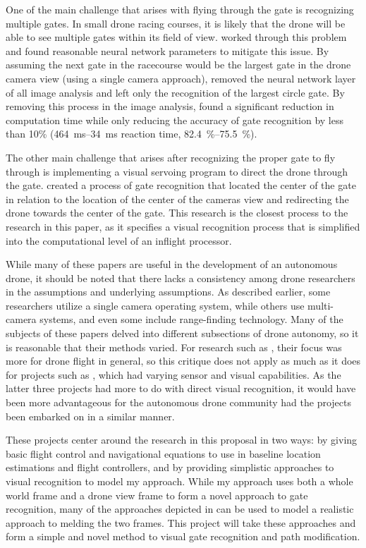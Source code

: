 One of the main challenge that arises with flying through the gate is recognizing multiple gates. In small drone racing courses, it is likely that the drone will be able to see multiple gates within its field of view. \cite{jung2018perception} worked through this problem and found reasonable neural network parameters to mitigate this issue. By assuming the next gate in the racecourse would be the largest gate in the drone camera view (using a single camera approach), \cite{jung2018perception} removed the neural network layer of all image analysis and left only the recognition of the largest circle gate. By removing this process in the image analysis, \cite{jung2018perception} found a significant reduction in computation time while only reducing the accuracy of gate recognition by less than 10\% (\SIrange{464}{34}{\milli\second} reaction time, \SIrange{82.4}{75.5}{\percent}).
    
The other main challenge that arises after recognizing the proper gate to fly through is implementing a visual servoing program to direct the drone through the gate. \cite{jung2018direct} created a process of gate recognition that located the center of the gate in relation to the location of the center of the cameras view and redirecting the drone towards the center of the gate. This research is the closest process to the research in this paper, as it specifies a visual recognition process that is simplified into the computational level of an inflight processor.
    
While many of these papers are useful in the development of an autonomous drone, it should be noted that there lacks a consistency among drone researchers in the assumptions and underlying assumptions. As described earlier, some researchers utilize a single camera operating system, while others use multi-camera systems, and even some include range-finding technology. Many of the subjects of these papers delved into different subsections of drone autonomy, so it is reasonable that their methods varied. For research such as \cite{svacha2017improving, loianno2017estimation, florence2018nanomap}, their focus was more for drone flight in general, so this critique does not apply as much as it does for projects such as \cite{zhilenkov2018use, jung2018perception, jung2018direct}, which had varying sensor and visual capabilities. As the latter three projects had more to do with direct visual recognition, it would have been more advantageous for the autonomous drone community had the projects been embarked on in a similar manner.
    
These projects center around the research in this proposal in two ways: by giving basic flight control and navigational equations to use in baseline location estimations and flight controllers, and by providing simplistic approaches to visual recognition to model my approach. While my approach uses both a whole world frame and a drone view frame to form a novel approach to gate recognition, many of the approaches depicted in \cite{zhilenkov2018use, jung2018perception, jung2018direct} can be used to model a realistic approach to melding the two frames. This project will take these approaches and form a simple and novel method to visual gate recognition and path modification.
